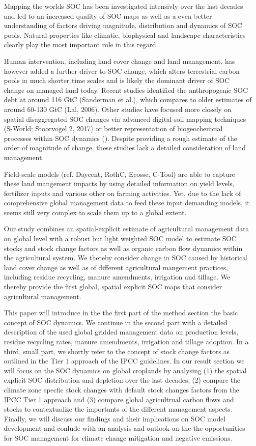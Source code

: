 \documentclass[gc, manuscript]{copernicus}
\begin{document}
Mapping the worlds SOC has been investigated intensivly over the last decades and led to an increased quality of SOC maps as well as a even better understanding of factors driving magnitude, distribution and dynamics of SOC pools. Natural properties like climatic, biophysical and landscape characteristics clearly play the most important role in this regard.

Human intervention, including land cover change and land management, has however added a further driver to SOC change, which alters terrestrial carbon pools in much shorter time scales and is likely the dominant driver of SOC change on managed land today. Recent studies identified the anthropogenic SOC debt at around 116 GtC (Sanderman et al.), which compares to older estimates of around 60-130 GtC (Lal, 2006). Other studies have focused more closely on spatial disaggregated SOC changes via advanced digital soil mapping techniques (S-World; Stoorvogel 2, 2017) or better representation of biogeochemcial processes within SOC dynamics (). Despite providing a rough estimate of the order of magnitude of change, these studies lack a detailed consideration of land management.

Field-scale models (ref. Daycent, RothC, Ecosse, C-Tool) are able to capture these land mangement impacts by using detailed information on yield levels, fertilizer inputs and various other on farming activities. Yet, due to the lack of comprehensive global management data to feed these input demanding models, it seems still very complex to scale them up to a global extent.

Our study combines an spatial-explicit estimate of agricultural management data on global level with a robust but light weighted SOC model to estimate SOC stocks and stock change factors as well as organic carbon flow dynamics within the agricultural system. We thereby consider change in SOC caused by historical land cover change as well as of different agricultural mangement practices, including residue recycling, manure amendments, irrigation and tillage. We thereby provide the first global, spatial explicit SOC maps that consider agricultural management.

This paper will introduce in the the first part of the method section the basic concept of SOC dynamics. We continue in the second part with a detailed description of the used global gridded management data on production levels, residue recycling rates, manure amendments, irrigation and tillage adoption. In a third, small part, we shortly refer to the concept of stock change factors as outlined in the Tier 1 approach of the IPCC guidelines.
In our result section we will focus on the SOC dynamics on global croplands by analysing (1) the spatial explicit SOC distribution and depletion over the last decades, (2) compare the climate zone specfic stock changes with default stock changes factors from the IPCC Tier 1 approach and (3) compare global agricultrual carbon flows and stocks to contextualize the importants of the different management aspects.
Finally, we will discuss our findings and their implications on SOC model development and conlude with an analysis and outlook on the the opportunities for SOC management for climate change mitigation and negative emissions.
\end{document}
